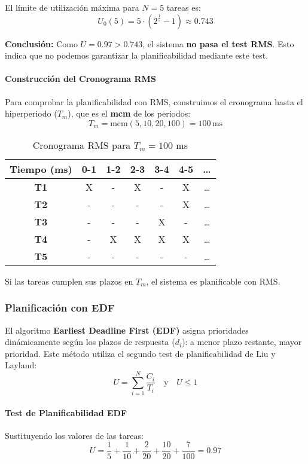 \documentclass[a4paper,12pt]{article}
\begin{document}
El límite de utilización máxima para \(N = 5\) tareas es:
\[
U_0(5) = 5 \cdot (2^{\frac{1}{5}} - 1) \approx 0.743
\]

\textbf{Conclusión:} Como \(U = 0.97 > 0.743\), el sistema \textbf{no pasa el test RMS}. Esto indica que no podemos garantizar la planificabilidad mediante este test.

\paragraph{Construcción del Cronograma RMS}
Para comprobar la planificabilidad con RMS, construimos el cronograma hasta el hiperperiodo (\(T_m\)), que es el \textbf{mcm} de los periodos:
\[
T_m = \text{mcm}(5, 10, 20, 100) = 100 \, \text{ms}
\]

\begin{table}[H]
\centering
\begin{tabular}{|c|c|c|c|c|c|c|}
\hline
\textbf{Tiempo (ms)} & 0-1 & 1-2 & 2-3 & 3-4 & 4-5 & \ldots \\ \hline
\textbf{T1} & X & - & X & - & X & \ldots \\ \hline
\textbf{T2} & - & - & - & - & X & \ldots \\ \hline
\textbf{T3} & - & - & - & X & - & \ldots \\ \hline
\textbf{T4} & - & X & X & X & X & \ldots \\ \hline
\textbf{T5} & - & - & - & - & - & \ldots \\ \hline
\end{tabular}
\caption{Cronograma RMS para \(T_m = 100\) ms}
\end{table}

Si las tareas cumplen sus plazos en \(T_m\), el sistema es planificable con RMS.


\subsubsection{Planificación con EDF}
El algoritmo \textbf{Earliest Deadline First (EDF)} asigna prioridades dinámicamente según los plazos de respuesta (\(d_i\)): a menor plazo restante, mayor prioridad. Este método utiliza el segundo test de planificabilidad de Liu y Layland:
\[
U = \sum_{i=1}^N \frac{C_i}{T_i} \quad \text{y} \quad U \leq 1
\]

\paragraph{Test de Planificabilidad EDF}
Sustituyendo los valores de las tareas:
\[
U = \frac{1}{5} + \frac{1}{10} + \frac{2}{20} + \frac{10}{20} + \frac{7}{100} = 0.97
\]
\end{document}
